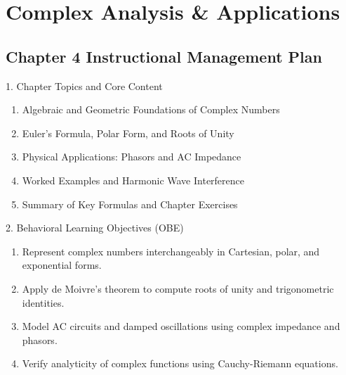 \chapter{Complex Analysis \& Applications}

\section*{Chapter 4 Instructional Management Plan}

\begin{planbox}[colframe=rbruNavy, colbacktitle=rbruNavy]{1. Chapter Topics and Core Content}
\begin{enumerate}[topsep=2pt, itemsep=1pt, partopsep=0pt, parsep=0pt, leftmargin=1.5em]
    \item Algebraic and Geometric Foundations of Complex Numbers
    \item Euler's Formula, Polar Form, and Roots of Unity
    \item Physical Applications: Phasors and AC Impedance
    \item Worked Examples and Harmonic Wave Interference
    \item Summary of Key Formulas and Chapter Exercises
\end{enumerate}
\end{planbox}

\begin{planbox}[colframe=rbruGreen, colbacktitle=rbruGreen]{2. Behavioral Learning Objectives (OBE)}
\begin{enumerate}[topsep=2pt, itemsep=1pt, partopsep=0pt, parsep=0pt, leftmargin=1.5em]
    \item Represent complex numbers interchangeably in Cartesian, polar, and exponential forms.
    \item Apply de Moivre's theorem to compute roots of unity and trigonometric identities.
    \item Model AC circuits and damped oscillations using complex impedance and phasors.
    \item Verify analyticity of complex functions using Cauchy-Riemann equations.
\end{enumerate}
\end{planbox}

